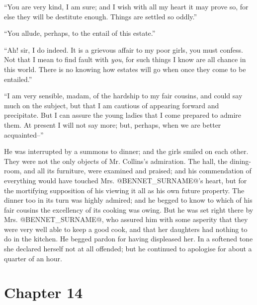 ``You are very kind, I am sure; and I wish with all my heart it may
prove so, for else they will be destitute enough. Things are settled so
oddly.''

``You allude, perhaps, to the entail of this estate.''

``Ah! sir, I do indeed. It is a grievous affair to my poor girls, you
must confess. Not that I mean to find fault with \textit{you}, for such things
I know are all chance in this world. There is no knowing how estates
will go when once they come to be entailed.''

``I am very sensible, madam, of the hardship to my fair cousins, and
could say much on the subject, but that I am cautious of appearing
forward and precipitate. But I can assure the young ladies that I come
prepared to admire them. At present I will not say more; but, perhaps,
when we are better acquainted--''

He was interrupted by a summons to dinner; and the girls smiled on each
other. They were not the only objects of Mr. Collins's admiration. The
hall, the dining-room, and all its furniture, were examined and praised;
and his commendation of everything would have touched Mrs. @BENNET_SURNAME@'s
heart, but for the mortifying supposition of his viewing it all as his
own future property. The dinner too in its turn was highly admired; and
he begged to know to which of his fair cousins the excellency of its
cooking was owing. But he was set right there by Mrs. @BENNET_SURNAME@, who
assured him with some asperity that they were very well able to keep a
good cook, and that her daughters had nothing to do in the kitchen. He
begged pardon for having displeased her. In a softened tone she declared
herself not at all offended; but he continued to apologise for about a
quarter of an hour.



\chapter*{Chapter 14}


